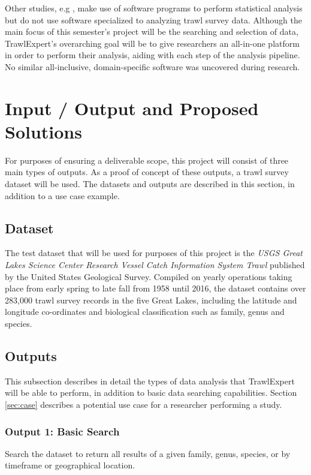 \documentclass{article}
\begin{document}
Other studies, e.g \cite{swartzman1992spatial}, make use of software programs to perform statistical analysis but do not use software specialized to analyzing trawl survey data. Although the main focus of this semester's project will be the searching and selection of data, TrawlExpert's overarching goal will be to give researchers an all-in-one platform in order to perform their analysis, aiding with each step of the analysis pipeline. No similar all-inclusive, domain-specific software was uncovered during research.

\section{Input / Output and Proposed Solutions}
For purposes of ensuring a deliverable scope, this project will consist of three main types of outputs. As a proof of concept of these outputs, a trawl survey dataset will be used. The datasets and outputs are described in this section, in addition to a use case example.

\subsection{Dataset}\label{sec:out}
The test dataset that will be used for purposes of this project is the \textit{USGS Great Lakes Science Center Research Vessel Catch Information System Trawl} published by the United States Geological Survey. Compiled on yearly operations taking place from early spring to late fall from 1958 until 2016, the dataset contains over 283,000 trawl survey records in the five Great Lakes, including the latitude and longitude co-ordinates and biological classification such as family, genus and species.

\subsection{Outputs}
This subsection describes in detail the types of data analysis that TrawlExpert will be able to perform, in addition to basic data searching capabilities. Section \ref{sec:case} describes a potential use case for a researcher performing a study.

\subsubsection{Output 1: Basic Search}
Search the dataset to return all results of a given family, genus, species, or by timeframe or geographical location.
\end{document}
